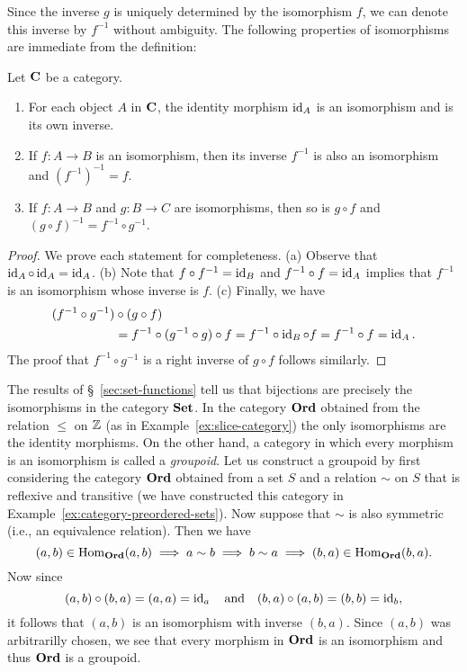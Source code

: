 Since the inverse \(g\) is uniquely determined by the isomorphism \(f\), we can
denote this inverse by \(f^{-1}\) without ambiguity. The following properties of
isomorphisms are immediate from the definition:

\begin{theorem}
    Let \(\mathbf{C}\) be a category.
    \begin{enumerate}[label=(\alph*), itemsep=0pt]
        \item For each object \(A\) in \(\mathbf{C}\), the identity morphism
        \(\operatorname{id}_A\) is an isomorphism and is its own inverse.
        \item If \(f: A \to B\) is an isomorphism, then its inverse \(f^{-1}\)
        is also an isomorphism and \((f^{-1})^{-1} = f\).
        \item If \(f : A \to B\) and \(g : B \to C\) are isomorphisms, then so
        is \(g \circ f\) and \((g \circ f)^{-1} = f^{-1} \circ g^{-1}\).
    \end{enumerate}
\end{theorem}

\begin{proof}
    We prove each statement for completeness. (a) Observe that \(\operatorname{id}_A \circ
    \operatorname{id}_A = \operatorname{id}_A\). (b) Note that \(f \circ f^{-1} = \operatorname{id}_B\) and \(f^{-1} \circ
    f = \operatorname{id}_A\) implies that \(f^{-1}\) is an isomorphism whose inverse is
    \(f\). (c) Finally, we have
    \begin{align*}
        (f^{-1} \circ g^{-1}) &\circ (g \circ f)\\
        &= f^{-1} \circ (g^{-1} \circ g) \circ f = f^{-1} \circ \operatorname{id}_B \circ f = f^{-1} \circ f = \operatorname{id}_A.
    \end{align*}
    The proof that \(f^{-1} \circ g^{-1}\) is a right inverse of \(g \circ f\)
    follows similarly.
\end{proof}

The results of \S~\ref{sec:set-functions} tell us that bijections are precisely
the isomorphisms in the category \(\mathbf{Set}\). In the category \(\mathbf{Ord}\)
obtained from the relation \(\leq\) on \(\mathbb{Z}\) (as in
Example~\ref{ex:slice-category}) the only isomorphisms are the identity
morphisms. On the other hand, a category in which every morphism is an
isomorphism is called a \emph{groupoid}. Let us construct a groupoid by first
considering the category \(\mathbf{Ord}\) obtained from a set \(S\) and a relation
\(\sim\) on \(S\) that is reflexive and transitive (we have constructed this
category in Example~\ref{ex:category-preordered-sets}). Now suppose that
\(\sim\) is also symmetric (i.e., an equivalence relation). Then we have
\[
    (a, b) \in \operatorname{Hom}_{\mathbf{Ord}}(a, b) \implies a \sim b \implies b \sim a \implies (b, a) \in \operatorname{Hom}_{\mathbf{Ord}}(b, a).
\]
Now since
\[
    (a, b) \circ (b, a) = (a, a) = \operatorname{id}_a \quad \text{and} \quad (b, a) \circ (a, b) = (b, b) = \operatorname{id}_b,
\]
it follows that \((a, b)\) is an isomorphism with inverse \((b, a)\). Since
\((a, b)\) was arbitrarilly chosen, we see that every morphism in \(\mathbf{Ord}\)
is an isomorphism and thus \(\mathbf{Ord}\) is a groupoid.


